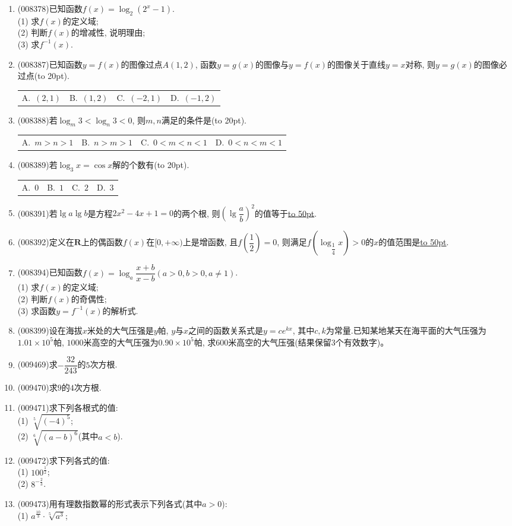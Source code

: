 \documentclass[10pt,a4paper]{article}
\newcommand{\blank}[1]{\underline{\hbox to #1pt{}}}
\newcommand{\bracket}[1]{(\hbox to #1pt{})}
\newcommand{\fourch}[4]{\par\begin{tabular}{p{.23\textwidth}p{.23\textwidth}p{.23\textwidth}p{.23\textwidth}}
A.~#1 &B.~#2& C.~#3& D.~#4
\end{tabular}}
\begin{document}
\begin{enumerate}[1.]
\item {\tiny (008378)}已知函数$f(x)=\log _2(2^x-1)$.\\
(1) 求$f(x)$的定义域;\\
(2) 判断$f(x)$的增减性, 说明理由;\\
(3) 求$f^{-1}(x)$.
\item {\tiny (008387)}已知函数$y=f(x)$的图像过点$A(1,2)$, 函数$y=g(x)$的图像与$y=f(x)$的图像关于直线$y=x$对称, 则$y=g(x)$的图像必过点\bracket{20}.
\fourch{$(2,1)$}{$(1,2)$}{$(-2,1)$}{$(-1,2)$}
\item {\tiny (008388)}若$\log_m 3<\log_n 3<0$, 则$m,n$满足的条件是\bracket{20}.
\fourch{$m>n>1$}{$n>m>1$}{$0<m<n<1$}{$0<n<m<1$}
\item {\tiny (008389)}若$\log _3x=\cos x$解的个数有\bracket{20}.
\fourch{$0$}{$1$}{$2$}{$3$}
\item {\tiny (008391)}若$\lg a\lg b$是方程$2x^2-4x+1=0$的两个根, 则$(\lg \dfrac ab)^2$的值等于\blank{50}.
\item {\tiny (008392)}定义在$\mathbf{R}$上的偶函数$f(x)$在$[0,+\infty)$上是增函数, 且$f(\dfrac 12)=0$, 则满足$f(\log _{\dfrac 14}x)>0$的$x$的值范围是\blank{50}.
\item {\tiny (008394)}已知函数$f(x)=\log _a\dfrac{x+b}{x-b}(a>0,b>0, a\ne 1)$.\\
(1) 求$f(x)$的定义域;\\
(2) 判断$f(x)$的奇偶性;\\
(3) 求函数$y=f^{-1}(x)$的解析式.
\item {\tiny (008399)}设在海拔$x$米处的大气压强是$y$帕, $y$与$x$之间的函数关系式是$y=ce^{kx}$, 其中$c,k$为常量.已知某地某天在海平面的大气压强为$1.01\times 10^5$帕, $1000$米高空的大气压强为$0.90\times 10^5$帕, 求$600$米高空的大气压强(结果保留$3$个有效数字)。
\item {\tiny (009469)}求$-\dfrac{32}{243}$的$5$次方根.
\item {\tiny (009470)}求$9$的$4$次方根.
\item {\tiny (009471)}求下列各根式的值:\\
(1) $\sqrt[5]{(-4)^5}$;\\
(2) $\sqrt[6]{(a-b)^6}$(其中$a<b$).
\item {\tiny (009472)}求下列各式的值:\\
(1) $100^\frac 12$;\\
(2) $8^{-\frac23}$.
\item {\tiny (009473)}用有理数指数幂的形式表示下列各式(其中$a>0$):\\
(1) $a^{\frac{10}3}\cdot \sqrt[5]{a^3}$;\\

\end{enumerate}
\end{document}
